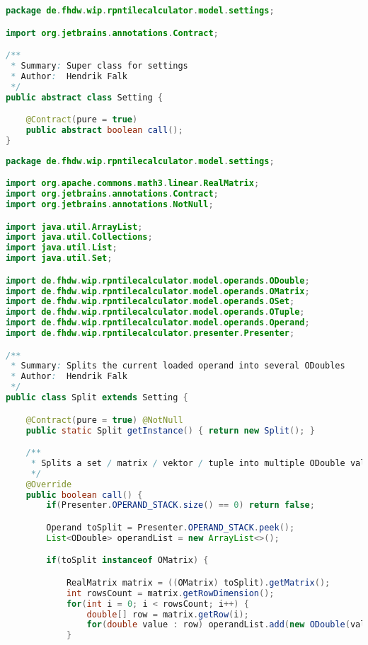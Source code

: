 \begin{lstlisting}[caption=Setting (Falk),label=list:Setting,language=Java]
package de.fhdw.wip.rpntilecalculator.model.settings;

import org.jetbrains.annotations.Contract;

/**
 * Summary: Super class for settings
 * Author:  Hendrik Falk
 */
public abstract class Setting {

    @Contract(pure = true)
    public abstract boolean call();
}

\end{lstlisting}    

\begin{lstlisting}[caption=Split (Falk),label=list:Split,language=Java]
package de.fhdw.wip.rpntilecalculator.model.settings;

import org.apache.commons.math3.linear.RealMatrix;
import org.jetbrains.annotations.Contract;
import org.jetbrains.annotations.NotNull;

import java.util.ArrayList;
import java.util.Collections;
import java.util.List;
import java.util.Set;

import de.fhdw.wip.rpntilecalculator.model.operands.ODouble;
import de.fhdw.wip.rpntilecalculator.model.operands.OMatrix;
import de.fhdw.wip.rpntilecalculator.model.operands.OSet;
import de.fhdw.wip.rpntilecalculator.model.operands.OTuple;
import de.fhdw.wip.rpntilecalculator.model.operands.Operand;
import de.fhdw.wip.rpntilecalculator.presenter.Presenter;

/**
 * Summary: Splits the current loaded operand into several ODoubles
 * Author:  Hendrik Falk
 */
public class Split extends Setting {

    @Contract(pure = true) @NotNull
    public static Split getInstance() { return new Split(); }

    /**
     * Splits a set / matrix / vektor / tuple into multiple ODouble values
     */
    @Override
    public boolean call() {
        if(Presenter.OPERAND_STACK.size() == 0) return false;

        Operand toSplit = Presenter.OPERAND_STACK.peek();
        List<ODouble> operandList = new ArrayList<>();

        if(toSplit instanceof OMatrix) {

            RealMatrix matrix = ((OMatrix) toSplit).getMatrix();
            int rowsCount = matrix.getRowDimension();
            for(int i = 0; i < rowsCount; i++) {
                double[] row = matrix.getRow(i);
                for(double value : row) operandList.add(new ODouble(value));
            }


\end{lstlisting}
